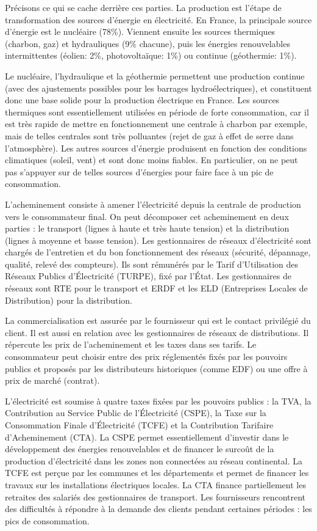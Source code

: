 \documentclass[10pt]{article}
\begin{document}
			Précisons ce qui se cache derrière ces parties.
			La production est l'étape de transformation des sources d'énergie en électricité.
			En France, la principale source d'énergie est le nucléaire (78\%). Viennent ensuite les sources thermiques (charbon, gaz) et hydrauliques (9\% chacune), puis les énergies renouvelables intermittentes (éolien: 2\%, photovoltaïque: 1\%) ou continue (géothermie: 1\%).
			
			Le nucléaire, l'hydraulique et la géothermie permettent une production continue (avec des ajustements possibles pour les barrages hydroélectriques), et constituent donc une base solide pour la production électrique en France. Les sources thermiques sont essentiellement utilisées en période de forte consommation, car il est très rapide de mettre en fonctionnement une centrale à charbon par exemple, mais de telles centrales sont très polluantes (rejet de gaz à effet de serre dans l'atmosphère). Les autres sources d'énergie produisent en fonction des conditions climatiques (soleil, vent) et sont donc moins fiables. En particulier, on ne peut pas s'appuyer sur de telles sources d'énergies pour faire face à un pic de consommation.
			
			L'acheminement consiste à amener l'électricité depuis la centrale de production vers le consommateur final. On peut décomposer cet acheminement en deux parties : le transport (lignes à haute et très haute tension) et la distribution (lignes à moyenne et basse tension). Les gestionnaires de réseaux d'électricité sont chargés de l'entretien et du bon fonctionnement des réseaux (sécurité, dépannage, qualité, relevé des compteurs). Ils sont rémunérés par le Tarif d'Utilisation des Réseaux Publics d'Électricité (TURPE), fixé par l'État. Les gestionnaires de réseaux sont RTE pour le transport et ERDF et les ELD (Entreprises Locales de Distribution) pour la distribution.
			
			La commercialisation est assurée par le fournisseur qui est le contact privilégié du client. Il est aussi en relation avec les gestionnaires de réseaux de distributions. Il répercute les prix de l'acheminement et les taxes dans ses tarifs. Le consommateur peut choisir entre des prix réglementés fixés par les pouvoirs publics et proposés par les distributeurs historiques (comme EDF) ou une offre à prix de marché (contrat).
			
			L'électricité est soumise à quatre taxes fixées par les pouvoirs publics : la TVA, la Contribution au Service Public de l'Électricité (CSPE), la Taxe sur la Consommation Finale d'Électricité (TCFE) et la Contribution Tarifaire d'Acheminement (CTA). La CSPE permet essentiellement d'investir dans le développement des énergies renouvelables et de financer le surcoût de la production d'électricité dans les zones non connectées au réseau continental. La TCFE est perçue par les communes et les départements et permet de financer les travaux sur les installations électriques locales. La CTA finance partiellement les retraites des salariés des gestionnaires de transport.
			Les fournisseurs rencontrent des difficultés à répondre à la demande des clients pendant certaines périodes : les pics de consommation.
		
\end{document}
